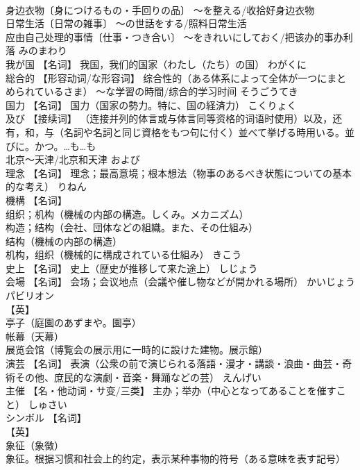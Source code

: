 \documentclass[8pt]{extreport}
\begin{document}
\begin{CJK}{UTF8}{min}
\\	身边衣物〔身につけるもの・手回りの品〕 ～を整える/收拾好身边衣物 
\\	日常生活〔日常の雑事〕 ～の世話をする/照料日常生活 
\\	应由自己处理的事情〔仕事・つき合い〕 ～をきれいにしておく/把该办的事办利落	みのまわり	
\\	我が国	【名词】 我国，我们的国家（わたし（たち）の国）	わがくに	
\\	総合的	【形容动词/な形容词】 综合性的（ある体系によって全体が一つにまとめられているさま） ～な学習の時間/综合的学习时间	そうごうてき	
\\	国力	【名词】 国力（国家の勢力。特に、国の経済力）	こくりょく	
\\	及び	【接续词】 （连接并列的体言或与体言同等资格的词语时使用）以及，还有，和，与（名詞や名詞と同じ資格をもつ句に付く）並べて挙げる時用いる。並びに。かつ。…も…も 
\\	北京～天津/北京和天津	および	
\\	理念	【名词】 理念；最高意境；根本想法（物事のあるべき状態についての基本的な考え）	りねん	
\\	機構	【名词】 
\\	组织；机构（機械の内部の構造。しくみ。メカニズム） 
\\	构造；结构（会社、団体などの組織。また、その仕組み） 
\\	结构（機械の内部の構造） 
\\	机构，组织（機械的に構成されている仕組み）	きこう	
\\	史上	【名词】 史上（歴史が推移して来た途上）	しじょう	
\\	会場	【名词】 会场；会议地点（会議や催し物などが開かれる場所）	かいじょう	
\\	パビリオン	
\\	【英】
\\	亭子（庭園のあずまや。園亭） 
\\	帐幕（天幕） 
\\	展览会馆（博覧会の展示用に一時的に設けた建物。展示館）		
\\	演芸	【名词】 表演（公衆の前で演じられる落語・漫才・講談・浪曲・曲芸・奇術その他、庶民的な演劇・音楽・舞踊などの芸）	えんげい	
\\	主催	【名・他动词・サ变/三类】 主办；举办（中心となってあることを催すこと）	しゅさい	
\\	シンボル	【名词】 
\\	【英】
\\	象征（象徴） 
\\	象征。根据习惯和社会上的约定，表示某种事物的符号（ある意味を表す記号）		

\end{CJK}
\end{document}
